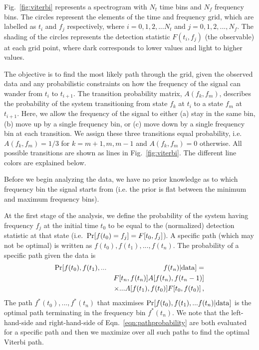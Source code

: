 \documentclass[paper-main.tex]{subfiles}
\begin{document}
Fig.~\ref{fig:viterbi} represents a spectrogram with $N_t$ time bins and $N_f$ frequency bins.
The circles represent the elements of the time and frequency grid, which are labelled as  
$t_i$ and $f_j$ respectively, where $i=0,1,2,...N_t$ and $j=0,1,2,...,N_f$. 
The shading of the circles represents the detection statistic $F(t_i,f_j)$ (the observable) at each grid point, where dark corresponds to lower values and light to higher values. 


The objective is to find the most likely path through the grid, given the observed data and any probabilistic constraints on how the frequency of the signal can wander from $t_i$ to $t_{i+1}$. 
The transition probability matrix, $A(f_k,f_m)$, describes the probability of the system transitioning from state $f_k$ at $t_i$ to a state $f_{m}$ at $t_{i+1}$. 
Here, we allow the frequency of the signal to either (a) stay in the same bin, (b) move up by a single frequency bin, or (c) move down by a single frequency bin at each transition. 
We assign these three transitions equal probability, i.e.\ $A(f_k,f_m)=1/3$ for $k=m+1,m,m-1$ and $A(f_k,f_m)=0$ otherwise.
All possible transitions are shown as lines in Fig.~\ref{fig:viterbi}.
The different line colors are explained below. 





Before we begin analyzing the data, we have no prior knowledge as to which frequency bin the signal starts from (i.e. the prior is flat between the minimum and maximum frequency bins).

At the first stage of the analysis, we define the probability of the system having frequency $f_j$ at the initial time $t_0$ to be equal to the (normalized) detection statistic at that state (i.e.\  ${\rm Pr}[f(t_0) = f_j] = F[t_0,f_j]$).
A specific path (which may not be optimal) is written as $f(t_0), f(t_1),..., f(t_n)$. 
The probability of a specific path given the data is 
\begin{eqnarray}
{\rm Pr}[ f(t_0), f(t_1),... && f(t_n) | {\rm data}] = \nonumber\\
          && F[t_n,f(t_n)] A[f(t_n),f(t_n-1)] \nonumber \\
          && \times... A[f(t_1),f(t_0)] F[t_0,f(t_0)] \,,
\label{eqn:pathprobability}
\end{eqnarray}
The path $f^\ast(t_0),...,f^\ast(t_n)$ that maximises ${\rm Pr}[ f(t_0), f(t_1),... f(t_n) | {\rm data}]$ is the optimal path terminating in the frequency bin $f^\ast(t_n)$. 
We note that the left-hand-side and right-hand-side of Eqn.~\ref{eqn:pathprobability} are both evaluated for a specific path and then we maximize over all such paths to find the optimal Viterbi path. 
\end{document}
